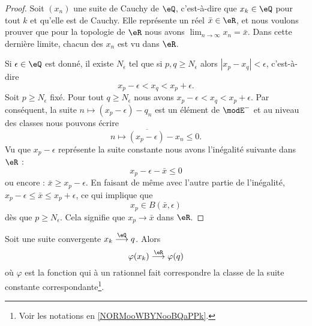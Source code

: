 \begin{proof}
    Soit \( (x_n)\) une suite de Cauchy de \( \eQ\), c'est-à-dire que \( x_k\in \eQ\) pour tout \( k\) et qu'elle est de Cauchy. Elle représente un réel \( \bar x\in \eR\), et nous voulons prouver que pour la topologie de \( \eR\) nous avons \( \lim_{n\to \infty} x_n=\bar x\). Dans cette dernière limite, chacun des \( x_n\) est vu dans \( \eR\).

    Si \( \epsilon\in \eQ\) est donné, il existe \( N_{\epsilon}\) tel que si \( p,q\geq N_{\epsilon}\) alors \( | x_p-x_q |< \epsilon\), c'est-à-dire
    \begin{equation}
        x_p-\epsilon<x_q<x_p+\epsilon.
    \end{equation}
    Soit \( p\geq N_{\epsilon}\) fixé. Pour tout \( q\geq N_{\epsilon}\) nous avons \(  x_p-\epsilon<x_q<x_p+\epsilon \). Par conséquent, la suite \( n\mapsto (x_p-\epsilon)-q_n\) est un élément de \( \modE^-\) et au niveau des classes nous pouvons écrire
    \begin{equation}
        \overline{ n\mapsto (x_p-\epsilon)-x_n }\leq 0.
    \end{equation}
    Vu que \( x_p-\epsilon\) représente la suite constante nous avons l'inégalité suivante dans \( \eR\) :
    \begin{equation}
        x_p-\epsilon-\bar x\leq 0
    \end{equation}
    ou encore : \( \bar x\geq x_p-\epsilon\). En faisant de même avec l'autre partie de l'inégalité, \( x_p-\epsilon\leq \bar x\leq x_p+\epsilon\), ce qui implique que
    \begin{equation}
        x_p\in B(\bar x,\epsilon)
    \end{equation}
    dès que \( p\geq N_{\epsilon}\). Cela signifie que \( x_p\to \bar x\) dans \( \eR\).
\end{proof}

\begin{proposition}     \label{PROPooZSQYooWRKNGY}
    Soit une suite convergente \( x_k\stackrel{\eQ}{\longrightarrow}q\). Alors
    \begin{equation}
        \varphi(x_k)\stackrel{\eR}{\longrightarrow}\varphi(q)
    \end{equation}
    où \( \varphi\) est la fonction qui à un rationnel fait correspondre la classe de la suite constante correspondante\footnote{Voir les notations en \ref{NORMooWBYNooBQaPPk}.}. 
\end{proposition}

